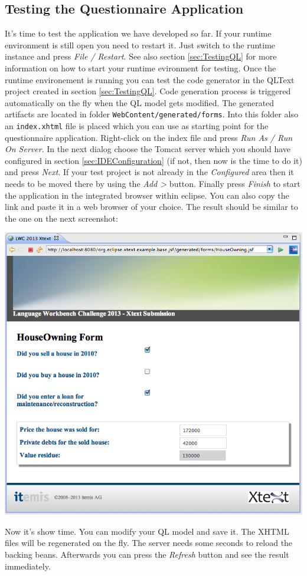 \subsection{Testing the Questionnaire Application}
\label{sec:TestingQLApplication}

It's time to test the application we have developed so far. If your runtime
environment is still open you need to restart it. Just switch to the runtime
instance and press \emph{File / Restart}. See also section \ref{sec:TestingQL}
for more information on how to start your runtime evironment for testing. Once
the runtime environement is running you can test the code generator in the
QLText project created in section \ref{sec:TestingQL}. Code generation process
is triggered automatically on the fly when the QL model gets modified. The
generated artifacts are located in folder \texttt{WebContent/generated/forms}.
Into this folder also an \texttt{index.xhtml} file is placed which you can use
as starting point for the questionnaire application. Right-click on the index
file and press \emph{Run As / Run On Server}. In the next dialog choose the
Tomcat server which you should have configured in section
\ref{sec:IDEConfiguration} (if not, then now is the time to do it) and press
\emph{Next}. If your test project is not already in the \emph{Configured} area
then it needs to be moved there by using the \emph{Add >} button. Finally press
\emph{Finish} to start the application in the integrated browser within eclipse.
You can also copy the link and paste it in a web browser of your choice. The
result should be similar to the one on the next screenshot:

\begin{center}
\includegraphics[width=15cm]{./images/chapter02/questionnaireApplication.png}
\end{center}
 
Now it's show time. You can modify your QL model and save it. The XHTML files
will be regenerated on the fly. The server needs some seconds to reload the
backing beans. Afterwards you can press the \emph{Refresh} button and see the
result immediately.
